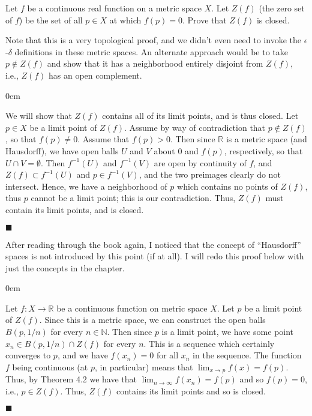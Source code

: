 \documentclass[12pt]{article}
\renewcommand{\qed}{\hfill$\blacksquare$}
\renewenvironment{proof}{\begin{addmargin}[1em]{0em}\begin{newproof}}{\end{newproof}\end{addmargin}\qed}
\newenvironment{problem}[2][Exercise]{\begin{trivlist}
\item[\hskip \labelsep {\bfseries #1}\hskip \labelsep {\bfseries #2.}]}{\end{trivlist}}
\begin{document}
\begin{problem}{4.3}
Let $f$ be a continuous real function on a metric space $X$. Let $Z\left(f\right)$ (the zero set of $f$) be the set of all $p\in X$ at which $f\left(p\right)=0$. Prove that $Z\left(f\right)$ is closed.
\end{problem}
{\color{red} Note that this is a very topological proof, and we didn't even need to invoke the $\epsilon$-$\delta$ definitions in these metric spaces. An alternate approach would be to take $p\notin Z\left(f\right)$ and show that it has a neighborhood entirely disjoint from $Z\left(f\right)$, i.e., $Z\left(f\right)$ has an open complement.}\\
\begin{proof}
We will show that $Z\left(f\right)$ contains all of its limit points, and is thus closed. Let $p\in X$ be a limit point of $Z\left(f\right)$. Assume by way of contradiction that $p \notin Z\left(f\right)$, so that $f\left(p\right) \neq 0$. Assume that $f\left(p\right)>0$. Then since $\mathbb{R}$ is a metric space (and Hausdorff), we have open balls $U$ and $V$ about $0$ and $f\left(p\right)$, respectively, so that $U\cap V = \emptyset$. Then $f^{-1}\left(U\right)$ and $f^{-1}\left(V\right)$ are open by continuity of $f$, and $Z\left(f\right)\subset f^{-1}\left(U\right)$ and $p \in f^{-1}\left(V\right)$, and the two preimages clearly do not intersect. Hence, we have a neighborhood of $p$ which contains no points of $Z\left(f\right)$, thus $p$ cannot be a limit point; this is our contradiction. Thus, $Z\left(f\right)$ must contain its limit points, and is closed.
\end{proof}

{\color{red}After reading through the book again, I noticed that the concept of ``Hausdorff'' spaces is not introduced by this point (if at all). I will redo this proof below with just the concepts in the chapter.}\\
\begin{proof}
Let $f:X\rightarrow \mathbb{R}$ be a continuous function on metric space $X$. Let $p$ be a limit point of $Z\left(f\right)$. Since this is a metric space, we can construct the open balls $B\left(p,1/n\right)$ for every $n\in \mathbb{N}$. Then since $p$ is a limit point, we have some point $x_n \in B\left(p,1/n\right)\cap Z\left(f\right)$ for every $n$. This is a sequence which certainly converges to $p$, and we have $f\left(x_n\right)=0$ for all $x_n$ in the sequence. The function $f$ being continuous (at $p$, in particular) means that $\lim_{x\rightarrow p} f\left(x\right) = f\left(p\right)$. Thus, by Theorem 4.2 we have that $\lim_{n\rightarrow \infty} f\left(x_n\right) = f\left(p\right)$ and so $f\left(p\right)=0$, i.e., $p\in Z\left(f\right)$. Thus, $Z\left(f\right)$ contains its limit points and so is closed.
\end{proof}
\end{document}
